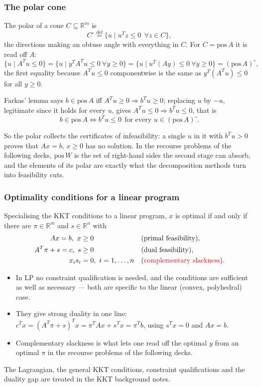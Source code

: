 \documentclass[aspectratio=169]{beamer}
\providecommand{\red}{\color{red}}
\def\RR{\mathbb{R}}
\begin{document}
\begin{frame}
\frametitle{The polar cone}
\small

The {\red polar} of a cone $C \subseteq \RR^m$ is
\[
C^{\circ} \overset{\mathrm{def}}{=} \lbrace u \mid u^Tz \leq 0 \ \ \forall z \in C \rbrace,
\]
the directions making an obtuse angle with everything in $C$. For $C = \text{pos}\,A$ it is read off $A$:
\[
\lbrace u \mid A^Tu \leq 0 \rbrace
= \lbrace u \mid y^TA^Tu \leq 0\ \forall y \geq 0 \rbrace
= \lbrace u \mid u^T(Ay) \leq 0\ \forall y \geq 0 \rbrace
= (\text{pos}\,A)^{\circ},
\]
the first equality because $A^Tu \leq 0$ componentwise is the same as $y^T(A^Tu) \leq 0$ for all $y \geq 0$.

Farkas' lemma says $b \in \text{pos}\,A$ iff $A^Tu \geq 0 \Rightarrow b^Tu \geq 0$; replacing $u$ by $-u$, legitimate since it holds for every $u$, gives $A^Tu \leq 0 \Rightarrow b^Tu \leq 0$, that is
\[
b \in \text{pos}\,A \iff b^Tu \leq 0 \ \ \text{for every } u \in (\text{pos}\,A)^{\circ}.
\]

{\footnotesize So the polar collects the {\red certificates of infeasibility}: a single $u$ in it with $b^Tu > 0$ proves that $Ax = b$, $x \geq 0$ has no solution. In the recourse problems of the following decks, $\text{pos}\,W$ is the set of right-hand sides the second stage can absorb, and the elements of its polar are exactly what the decomposition methods turn into {\red feasibility cuts}.}

\end{frame}

\begin{frame}
\frametitle{Optimality conditions for a linear program}

Specialising the KKT conditions to a linear program, $x$ is optimal {\red if and only if} there are $\pi \in \RR^m$ and $s \in \RR^n$ with
\begin{align*}
Ax = b,\ x &\geq 0 &&\text{(primal feasibility)},\\
A^T\pi + s = c,\ s &\geq 0 &&\text{(dual feasibility)},\\
x_is_i &= 0,\ i = 1, \ldots, n &&\text{({\red complementary slackness})}.
\end{align*}

\begin{itemize}
	\item
	In LP no constraint qualification is needed, and the conditions are {\red sufficient} as well as necessary --- both are specific to the linear (convex, polyhedral) case.
	\item
	They give strong duality in one line: $c^Tx = (A^T\pi+s)^Tx = \pi^TAx + s^Tx = \pi^Tb$, using $s^Tx = 0$ and $Ax = b$.
	\item
	Complementary slackness is what lets one read off the optimal $y$ from an optimal $\pi$ in the recourse problems of the following decks.
\end{itemize}

The Lagrangian, the general KKT conditions, constraint qualifications and the duality gap are treated in the {\red KKT background notes}.

\end{frame}
\end{document}
